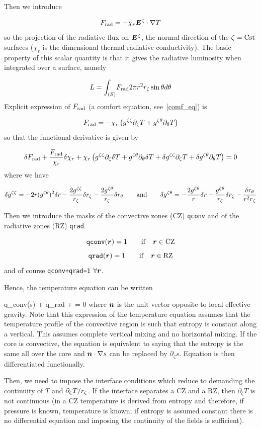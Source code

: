 Then we introduce

\[ \frad = -\chi_r\vE^\zeta\cdot\na T\]
so the projection of the radiative flux on $\vE^\zeta$, the normal
direction of the $\zeta={\rm Cst}$ surfaces ($\chi_r$ is the dimensional thermal
radiative conductivity). The basic property of this
scalar quantity is that it gives the radiative luminosity when
integrated over a surface, namely

\[ L= \int_{(S)}\! F_{\rm rad} 2\pi r^2r_\zeta\sin\theta d\theta\]
Explicit expression of $F_{\rm rad}$  (a comfort equation, see~\ref{comf_eq}) is

\[ F_{\rm rad} = -\chi_r\left(g^{\zeta\zeta}\partial_\zeta T + g^{\zeta\theta}\partial_\theta T \right)\]
so that the functional derivative is given by

\[ \delta F_{\rm rad} +\frac{F_{\rm rad}}{\chi_r}\delta\chi_r +\chi_r\left(
g^{\zeta\zeta}\partial_\zeta\delta T + g^{\zeta\theta}\partial_\theta\delta T +
\delta g^{\zeta\zeta}\partial_\zeta T + \delta g^{\zeta\theta}\partial_\theta T\right) = 0\]
where we have

\[ \delta g^{\zeta\zeta} = -2r(g^{\zeta\theta})^2\delta r -\frac{2g^{\zeta\zeta}}{r_\zeta}\delta r_\zeta
-\frac{2g^{\zeta\theta}}{r_\zeta}\delta r_\theta\qquad {\rm and}\qquad
\delta g^{\zeta\theta} = -\frac{2g^{\zeta\theta}}{r}\delta r -\frac{g^{\zeta\theta}}{r_\zeta}\delta r_\zeta
-\frac{\delta r_\theta}{r^2r_\zeta}\]

Then we introduce the masks of the convective zones (CZ) {\tt qconv} and
of the radiative zones (RZ) {\tt qrad}.

\[ {\tt qconv}(\vr) = 1 \qquad {\rm if}\quad \vr \in {\rm CZ}\]
\[ {\tt qrad}(\vr) = 1 \qquad {\rm if}\quad \vr \in {\rm RZ}\]
and of course {\tt qconv+qrad=1} $\forall \vr$.

Hence, the temperature equation can be written

\beq q_{\rm conv}(\vn\cdot\na s) +  q_{\rm rad}\lp{} + \Lambda\rho{}\rp = 0
where $\vn$ is the unit vector opposite to local effective gravity. Note
that this expression of the temperature equation assumes that the
temperature profile of the convective region is such that entropy is
constant along a vertical. This assumes complete vertical mixing and no
horizontal mixing. If the core is convective, the equation is equivalent
to saying that the entropy is the same all over the core and
$\vn\cdot\na s$ can be replaced by $\partial_\zeta s$. Equation
 is then differentiated functionally.

Then, we need to impose the interface conditions which reduce to
demanding the continuity of $T$ and $\partial_\zeta T/r_\zeta$. If the
interface separates a CZ and a RZ, then $\partial_\zeta T$ is not
continuous (in a CZ temperature is derived from entropy and therefore,
if pressure is known, temperature is known; if entropy is assumed
constant there is no differential equation and imposing the continuity
of the fields is sufficient).

